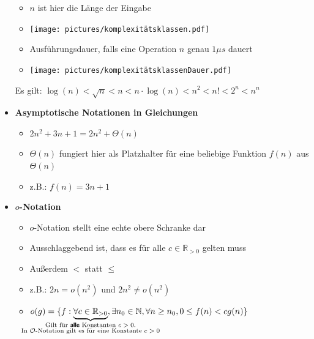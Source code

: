 \documentclass[
    12pt,
    a4paper,
    ngerman,
    color=3b,%
    marginpar=false,
    colorback=false,
    leqno,
]{tudaexercise}
\begin{document}
\begin{itemize}
          \begin{itemize}
              \item $n$ ist hier die Länge der Eingabe
              \item[] \texttt{[image: pictures/komplexitätsklassen.pdf]}
              \item Ausführungsdauer, falls eine Operation $n$ genau $1\mu s$ dauert
              \item[] \texttt{[image: pictures/komplexitätsklassenDauer.pdf]}
          \end{itemize}
          Es gilt: $\log(n) < \sqrt{n} < n < n\cdot \log(n) < n^2 < n! < 2^n<n^n$
    \item \textbf{Asymptotische Notationen in Gleichungen}
          \begin{itemize}
              \item $2n^2 + 3n + 1 = 2n^2 + \Theta(n)$
              \item $\Theta(n)$ fungiert hier als Platzhalter für eine beliebige Funktion $f(n)$ aus $\Theta(n)$
              \item z.B.: $f(n) = 3n + 1$
          \end{itemize}

    \item \textbf{$o$-Notation}
          \begin{itemize}
              \item $o$-Notation stellt eine echte obere Schranke dar
              \item Ausschlaggebend ist, dass es für alle $c \in \mathbb{R}_{>0}$ gelten muss
              \item Au\ss erdem $<$ statt $\leq$
              \item z.B.: $2n = o(n^2)$ und $2n^2 \neq o(n^2)$
              \item[] %
                    $o(g)=\{f:\underbrace{\forall c \in \mathbb{R}_{>0}}_{
                        \mathclap{
                            \substack{
                                \text{Gilt für \fatsf{alle} Konstanten $c>0$.}\\
                                \text{In $\mathcal{O}$-Notation gilt es für eine Konstante $c>0$}}}
                        }, \exists n_0 \in \mathbb{N}, \forall n \geq n_0, 0\leq f(n)<cg(n)\}$
          \end{itemize}


\end{itemize}
\end{document}
